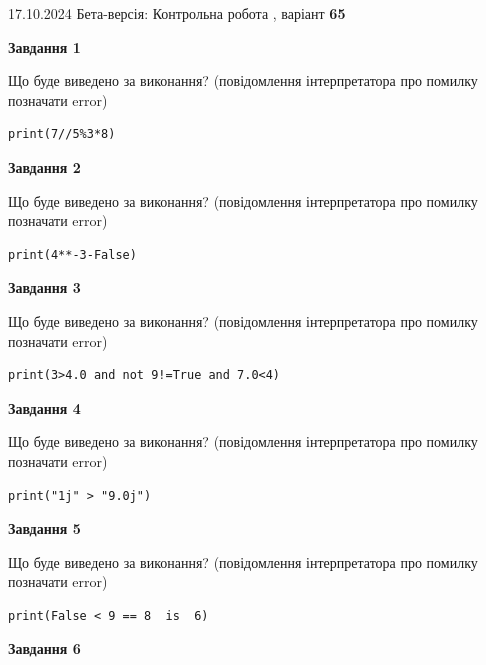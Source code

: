 \documentclass[12pt, ukrainian]{article}
\begin{document}
{\Large{17.10.2024 Бета-версія: Контрольна робота , варіант  \No \textbf { 65 }\par}}
{
\begin {large}
{\begin {center}\textbf{Завдання 1}\end {center}}

Що буде виведено за виконання? (повідомлення інтерпретатора про помилку позначати error)\par
\begin{verbatim}
print(7//5%3*8)
\end{verbatim}

{\begin {center}\textbf{Завдання 2}\end {center}}

Що буде виведено за виконання? (повідомлення інтерпретатора про помилку позначати error)\par
\begin{verbatim}
print(4**-3-False)
\end{verbatim}

{\begin {center}\textbf{Завдання 3}\end {center}}

Що буде виведено за виконання? (повідомлення інтерпретатора про помилку позначати error)\par
\begin{verbatim}
print(3>4.0 and not 9!=True and 7.0<4)
\end{verbatim}

{\begin {center}\textbf{Завдання 4}\end {center}}

Що буде виведено за виконання? (повідомлення інтерпретатора про помилку позначати error)\par
\begin{verbatim}
print("1j" > "9.0j")
\end{verbatim}

{\begin {center}\textbf{Завдання 5}\end {center}}

Що буде виведено за виконання? (повідомлення інтерпретатора про помилку позначати error)\par
\begin{verbatim}
print(False < 9 == 8  is  6)
\end{verbatim}

{\begin {center}\textbf{Завдання 6}\end {center}}


\end{large}}
\end{document}
